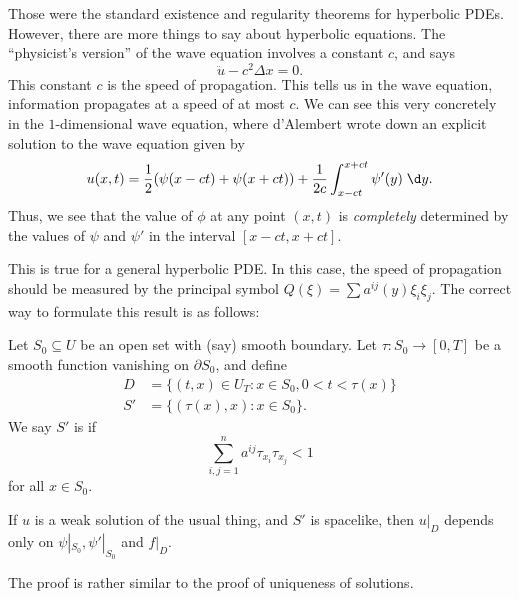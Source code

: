 \documentclass[a4paper]{article}
\begin{document}
Those were the standard existence and regularity theorems for hyperbolic PDEs. However, there are more things to say about hyperbolic equations. The ``physicist's version'' of the wave equation involves a constant $c$, and says
\[
  \ddot{u} - c^2 \Delta x = 0.
\]
This constant $c$ is the speed of propagation. This tells us in the wave equation, information propagates at a speed of at most $c$. We can see this very concretely in the $1$-dimensional wave equation, where d'Alembert wrote down an explicit solution to the wave equation given by
\[
  u(x, t) = \frac{1}{2} (\psi(x - ct) + \psi(x + ct)) + \frac{1}{2c} \int_{x - ct}^{x + ct} \psi'(y) \;\d y.
\]
Thus, we see that the value of $\phi$ at any point $(x, t)$ is \emph{completely} determined by the values of $\psi$ and $\psi'$ in the interval $[x - ct, x + ct]$.
\begin{center}
\end{center}

This is true for a general hyperbolic PDE. In this case, the speed of propagation should be measured by the principal symbol $Q(\xi) = \sum a^{ij}(y) \xi_i \xi_j$. The correct way to formulate this result is as follows:

Let $S_0 \subseteq U$ be an open set with (say) smooth boundary. Let $\tau: S_0 \to [0, T]$ be a smooth function vanishing on $\partial S_0$, and define
\begin{align*}
  D &= \{(t, x) \in U_T : x \in S_0, 0 < t < \tau(x)\}\\
  S' &= \{(\tau(x), x): x \in S_0\}.
\end{align*}
We say $S'$ is  if
\[
  \sum_{i, j = 1}^n a^{ij} \tau_{x_i} \tau_{x_j} < 1
\]
for all $x \in S_0$.

\begin{thm}
  If $u$ is a weak solution of the usual thing, and $S'$ is spacelike, then $u|_D$ depends only on $\psi|_{S_0}, \psi'|_{S_0}$ and $f|_{D}$.
\end{thm}
The proof is rather similar to the proof of uniqueness of solutions.
\end{document}

